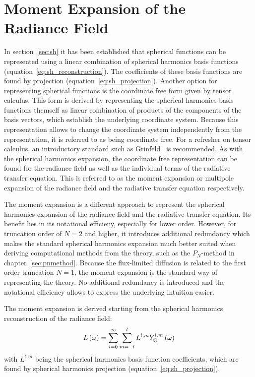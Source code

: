 \section{Moment Expansion of the Radiance Field}
\label{sec:da_moment_expansion_L}

In section~\ref{sec:sh} it has been established that spherical functions can be represented using a linear combination of spherical harmonics basis functions (equation~\ref{eq:sh_reconstruction}). The coefficients of these basis functions are found by projection (equation~\ref{eq:sh_projection}). Another option for representing spherical functions is the coordinate free form given by tensor calculus. This form is derived by representing the spherical harmonics basis functions themself as linear combination of products of the components of the basis vectors, which establish the underlying coordinate system. Because this representation allows to change the coordinate system independently from the representation, it is referred to as being coordinate free. For a refresher on tensor calculus, an introductory standard such as Grinfeld~\cite{Grinfeld13} is recommended. As with the spherical harmonics expansion, the coordinate free representation can be found for the radiance field as well as the individual terms of the radiative transfer equation. This is referred to as the moment expansion or multipole expansion of the radiance field and the radiative transfer equation respectively.

The moment expansion is a different approach to represent the spherical harmonics expansion of the radiance field and the radiative transfer equation. Its benefit lies in its notational efficieny, especially for lower order. However, for truncation order of $N=2$ and higher, it introduces additional redundancy which makes the standard spherical harmonics expansion much better suited when deriving computational methods from the theory, such as the $P_N$-method in chapter~\ref{sec:pnmethod}. Because the flux-limited diffusion is related to the first order truncation $N=1$, the moment expansion is the standard way of representing the theory. No additional redundancy is introduced and the notational efficiency allows to express the underlying intuition easier.

The moment expansion is derived starting from the spherical harmonics reconstruction of the radiance field:
\begin{align}
\label{eq:fld_moment_expansion_sh_expansion}
L\left(\omega\right) =
\sum_{l=0}^{\infty}\sum_{m=-l}^{l}L^{l,m}Y_{\mathbb{C}}^{l,m}
\left(\omega\right)
\end{align}
with $L^{l,m}$ being the spherical harmonics basis function coefficients, which are found by spherical harmonics projection (equation~\ref{eq:sh_projection}).

